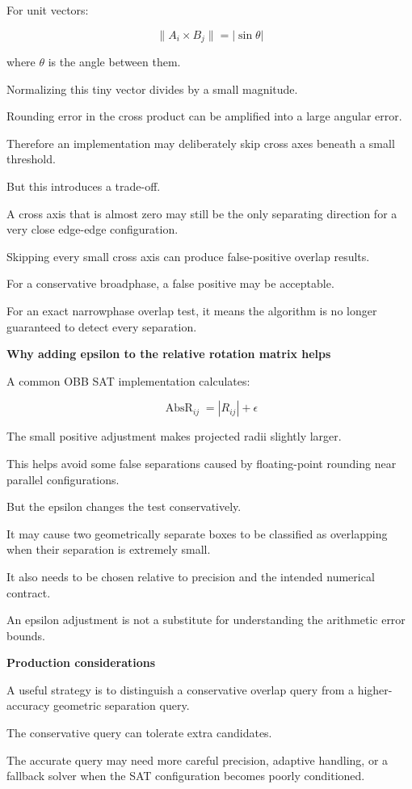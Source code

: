 For unit vectors:

\[
\|A_i\times B_j\|=|\sin\theta|
\]

where \(\theta\) is the angle between them.

Normalizing this tiny vector divides by a small magnitude.

Rounding error in the cross product can be amplified into a large angular error.

Therefore an implementation may deliberately skip cross axes beneath a small threshold.

But this introduces a trade-off.

A cross axis that is almost zero may still be the only separating direction for a very close edge-edge configuration.

Skipping every small cross axis can produce false-positive overlap results.

For a conservative broadphase, a false positive may be acceptable.

For an exact narrowphase overlap test, it means the algorithm is no longer guaranteed to detect every separation.

\textbf{Why adding epsilon to the relative rotation matrix helps}

A common OBB SAT implementation calculates:

\[
\boxed{ \operatorname{AbsR}_{ij}=|R_{ij}|+\epsilon }
\]

The small positive adjustment makes projected radii slightly larger.

This helps avoid some false separations caused by floating-point rounding near parallel configurations.

But the epsilon changes the test conservatively.

It may cause two geometrically separate boxes to be classified as overlapping when their separation is extremely small.

It also needs to be chosen relative to precision and the intended numerical contract.

An epsilon adjustment is not a substitute for understanding the arithmetic error bounds.

\textbf{Production considerations}

A useful strategy is to distinguish a conservative overlap query from a higher-accuracy geometric separation query.

The conservative query can tolerate extra candidates.

The accurate query may need more careful precision, adaptive handling, or a fallback solver when the SAT configuration becomes poorly conditioned.

